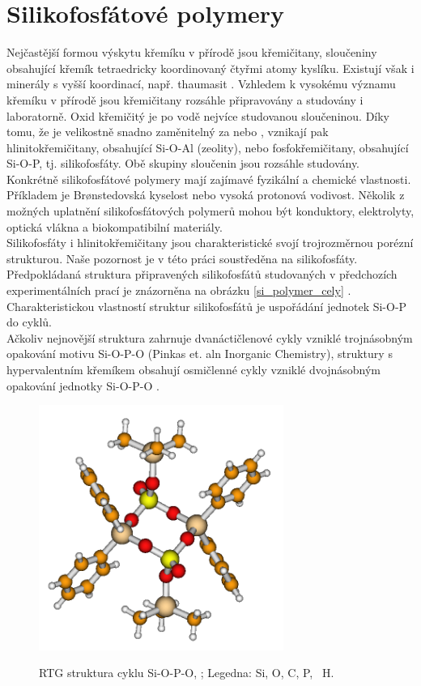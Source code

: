 \documentclass[
  digital, %
  table,   %
  lof,     %
  lot,     %
  oneside,
]{fithesis3}
\begin{document}
\section{Silikofosfátové polymery}
Nejčastější formou výskytu křemíku v přírodě jsou křemičitany, sloučeniny obsahující křemík tetraedricky koordinovaný čtyřmi atomy kyslíku. Existují však i minerály s vyšší koordinací, např. thaumasit \cite{Edge:a08100}. Vzhledem k vysokému významu křemíku v přírodě jsou křemičitany rozsáhle připravovány a studovány i laboratorně. Oxid křemičitý  je po vodě nejvíce studovanou sloučeninou. Díky tomu, že  je velikostně snadno zaměnitelný za  nebo , vznikají pak hlinitokřemičitany, obsahující Si-O-Al (zeolity), nebo fosfokřemičitany, obsahující Si-O-P, tj. silikofosfáty. Obě skupiny sloučenin jsou rozsáhle studovány. Konkrétně silikofosfátové polymery mají zajímavé fyzikální a chemické vlastnosti. Příkladem je Brønstedovská kyselost nebo vysoká protonová vodivost. Několik z možných uplatnění silikofosfátových polymerů mohou být konduktory, elektrolyty, optická vlákna a biokompatibilní materiály.\\
Silikofosfáty i hlinitokřemičitany jsou charakteristické svojí trojrozměrnou  porézní strukturou. Naše pozornost je v této práci soustředěna na silikofosfáty. Předpokládaná struktura připravených silikofosfátů studovaných v předchozích experimentálních prací je znázorněna na obrázku \ref{si_polymer_cely} \cite{Styskalik2015thesis}. Charakteristickou vlastností struktur silikofosfátů je uspořádání jednotek Si-O-P do cyklů. \\
Ačkoliv nejnovější struktura zahrnuje dvanáctičlenové cykly vzniklé trojnásobným opakování motivu Si-O-P-O (Pinkas et. aln Inorganic Chemistry), struktury s hypervalentním křemíkem obsahují osmičlenné cykly vzniklé dvojnásobným opakování jednotky Si-O-P-O .
 \begin{figure}[h!]
 \caption{RTG struktura cyklu Si-O-P-O, \cite{C4TA06823H};  Legedna:  Si,  O,  C,  P, ~H.}
   \center
   \includegraphics[width=8cm]{rtg_kruh_samostatne.png}
   \label{rtg_cyklus}
   \end{figure}
\end{document}
